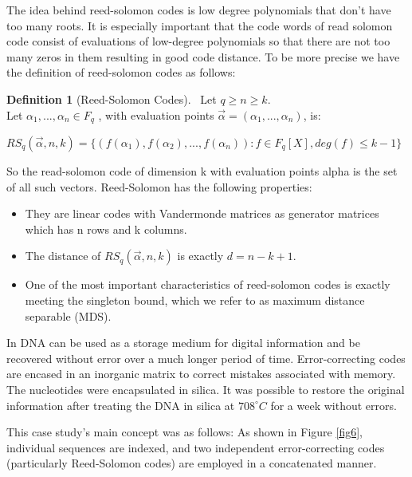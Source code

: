 \documentclass[10pt,twocolumn,twoside]{gsajnl}
\theoremstyle{definition}
\newtheorem{definition}{Definition}[section]
\begin{document}
The idea behind reed-solomon codes is low degree polynomials that don't have too many roots. It is especially important that the code words of read solomon code consist of evaluations of low-degree polynomials so that there are not too many zeros in them resulting in good code distance. To be more precise we have the definition of reed-solomon codes as follows:
\begin{definition}[Reed-Solomon Codes]
\ Let $q\geqslant n\geqslant k$.
\\ Let 	$\alpha_{1},...,\alpha_{n}\in F_{q}$ , with evaluation points $\overrightarrow{\alpha}=(\alpha_{1},...,\alpha_{n})$, is:
\begin{center}
$RS_{q}(\overrightarrow{\alpha},n,k)=\{(f(\alpha_{1}),f(\alpha_{2}),...,f(\alpha_{n})):f\in F_{q}[X], deg(f)\leqslant k-1\}$
\end{center}
\end{definition}
So the read-solomon code of dimension k with evaluation points alpha is the set of all such vectors.
Reed-Solomon has the following properties:
\begin{itemize}
    \item They are linear codes with Vandermonde matrices as generator matrices which has n rows and k columns.
    \item The distance of $RS_{q}(\overrightarrow{\alpha},n,k)$ is exactly $d=n-k+1$.
    \item One of the most important characteristics of reed-solomon codes is exactly meeting the singleton bound, which we refer to as maximum distance separable (MDS).
\end{itemize}

In \cite{grass2015robust} DNA can be used as a storage medium for digital information and be recovered without error over a much longer period of time. Error-correcting codes are encased in an inorganic matrix to correct mistakes associated with memory. The nucleotides were encapsulated in silica. It was possible to restore the original information after treating the DNA in silica at $708^\circ C$ for a week without errors.

This case study's main concept was as follows: As shown in Figure \ref{fig6}, individual sequences are indexed, and two independent error-correcting codes (particularly Reed-Solomon codes) are employed in a concatenated manner.
\end{document}
